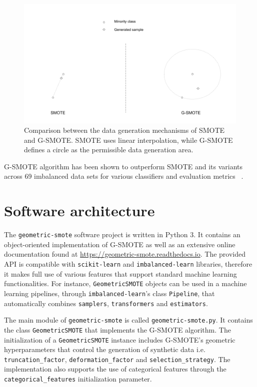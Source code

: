 \documentclass[twoside,11pt]{article}
\begin{document}
\begin{figure}
	\centering
	\includegraphics[width=1\linewidth]{artifacts/smote_vs_gsmote}
	\caption{Comparison between the data generation mechanisms of SMOTE and 
  G-SMOTE. SMOTE uses linear interpolation, while G-SMOTE defines a circle as the 
  permissible data generation area.}
	\label{fig:smote_vs_gsmote}
\end{figure}

G-SMOTE algorithm has been shown to outperform SMOTE and its variants across 69
imbalanced data sets for various classifiers and evaluation metrics
~\citep{Douzas2019}.

\section{Software architecture}

The \texttt{geometric-smote} software project is written in Python 3. It
contains an object-oriented implementation of G-SMOTE as well as an extensive
online documentation found at \url{https://geometric-smote.readthedocs.io}. The
provided API is compatible with \texttt{scikit-learn} and
\texttt{imbalanced-learn} libraries, therefore it makes full use of various
features that support standard machine learning functionalities. For instance,
\texttt{GeometricSMOTE} objects can be used in a machine learning pipelines,
through \texttt{imbalanced-learn}'s class \texttt{Pipeline}, that automatically
combines \texttt{samplers}, \texttt{transformers} and \texttt{estimators}.

The main module of \texttt{geometric-smote} is called
\texttt{geometric-smote.py}. It contains the class \texttt{GeometricSMOTE} that
implements the G-SMOTE algorithm. The initialization of a
\texttt{GeometricSMOTE} instance includes G-SMOTE's geometric hyperparameters
that control the generation of synthetic data i.e. \texttt{truncation\_factor},
\texttt{deformation\_factor} and \texttt{selection\_strategy}. The
implementation also supports the use of categorical features through the
\texttt{categorical\_features} initialization parameter.
\end{document}
